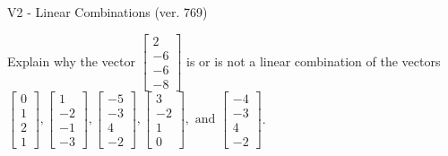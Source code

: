 \begin{exercise}
  \begin{exerciseTitle}V2 - Linear Combinations (ver. 769)\end{exerciseTitle}
  \begin{exerciseStatement}
    Explain why the vector \(\left[\begin{array}{c}
2 \\
-6 \\
-6 \\
-8
\end{array}\right]\)  is or is not a linear 
	combination of the vectors \(\left[\begin{array}{c}
0 \\
1 \\
2 \\
1
\end{array}\right] , \left[\begin{array}{c}
1 \\
-2 \\
-1 \\
-3
\end{array}\right] , \left[\begin{array}{c}
-5 \\
-3 \\
4 \\
-2
\end{array}\right] , \left[\begin{array}{c}
3 \\
-2 \\
1 \\
0
\end{array}\right] , \text{ and } \left[\begin{array}{c}
-4 \\
-3 \\
4 \\
-2
\end{array}\right]\).
	



\end{exerciseStatement}
\end{exercise}
